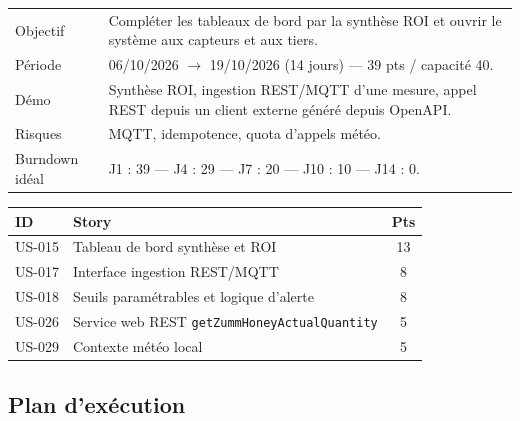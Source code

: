 \begin{center}
\begin{tabular}{lp{11cm}}
\toprule
Objectif  & Compléter les tableaux de bord par la synthèse ROI et ouvrir le
            système aux capteurs et aux tiers. \\
Période   & 06/10/2026 $\rightarrow$ 19/10/2026 (14 jours) --- 39 pts / capacité 40. \\
Démo      & Synthèse ROI, ingestion REST/MQTT d'une mesure, appel REST
            depuis un client externe généré depuis OpenAPI. \\
Risques   & MQTT, idempotence, quota d'appels météo. \\
Burndown idéal & J1 : 39 --- J4 : 29 --- J7 : 20 --- J10 : 10 --- J14 : 0. \\
\bottomrule
\end{tabular}
\end{center}

\begin{center}
\begin{tabular}{lp{9cm}c}
\toprule
\textbf{ID} & \textbf{Story} & \textbf{Pts} \\
\midrule
US-015 & Tableau de bord synthèse et ROI                       & 13 \\
US-017 & Interface ingestion REST/MQTT                         & 8 \\
US-018 & Seuils paramétrables et logique d'alerte              & 8 \\
US-026 & Service web REST \texttt{getZummHoneyActualQuantity}   & 5 \\
US-029 & Contexte météo local                                  & 5 \\
\bottomrule
\end{tabular}
\end{center}

\subsection{Plan d'exécution}

